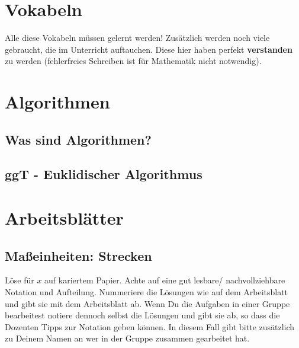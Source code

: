 \documentclass[a4paper]{book}%
\newcommand{\anweisungArbeitsblatt}{Löse für $x$ auf kariertem Papier. Achte auf eine gut lesbare/ nachvollziehbare Notation und Aufteilung. Nummeriere die Lösungen wie auf dem Arbeitsblatt und gibt sie mit dem Arbeitsblatt ab. Wenn Du die Aufgaben in einer Gruppe bearbeitest notiere dennoch selbst die Lösungen und gibt sie ab, so dass die Dozenten Tipps zur Notation geben können. In diesem Fall gibt bitte zusätzlich zu Deinem Namen an wer in der Gruppe zusammen gearbeitet hat.}
\theoremstyle{definition}
\begin{document}
\appendix

\chapter{Vokabeln}

Alle diese Vokabeln müssen gelernt werden! Zusätzlich werden noch viele gebraucht, die im Unterricht auftauchen. Diese hier haben perfekt \textbf{verstanden} zu werden (fehlerfreies Schreiben ist für Mathematik nicht notwendig).


\chapter{Algorithmen}

\section{Was sind Algorithmen?}

\section{ggT - Euklidischer Algorithmus}


\chapter{Arbeitsblätter}

\newpage
\section{Maßeinheiten: Strecken}

\anweisungArbeitsblatt
\end{document}
